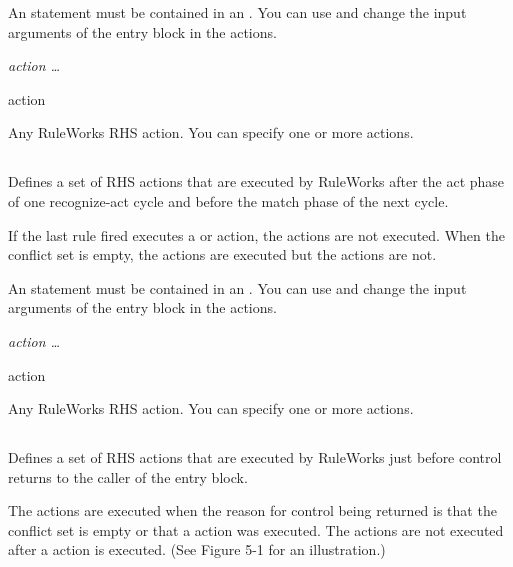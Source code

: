 {{An  statement must be contained in an .
You can use and change the input arguments of the entry block
in the  actions.

\Format

 \it{action} \ldots

\begin{arguments}
\item[action]

  Any RuleWorks RHS action. You can specify one or more actions.
\end{arguments}

\subsection{}

Defines a set of RHS actions that are executed by RuleWorks after the
act phase of one recognize-act cycle and before the match phase of the
next cycle.

If the last rule fired executes a  or  action, the
 actions are not executed. When the conflict set is
empty, the  actions are executed but the 
actions are not.

An  statement must be contained in an .
You can use and change the input arguments of the entry block in the
 actions.

\Format

 \it{action} \ldots

\begin{arguments}
\item[action]

  Any RuleWorks RHS action. You can specify one or more actions.
\end{arguments}

\subsection{}

Defines a set of RHS actions that are executed by RuleWorks
just before control returns to the caller of the entry block.

The  actions are executed when the reason for control
being returned is that the conflict set is empty or that a
 action was executed. The  actions are not
executed after a  action is executed. (See Figure 5-1 for
an illustration.)

}}
